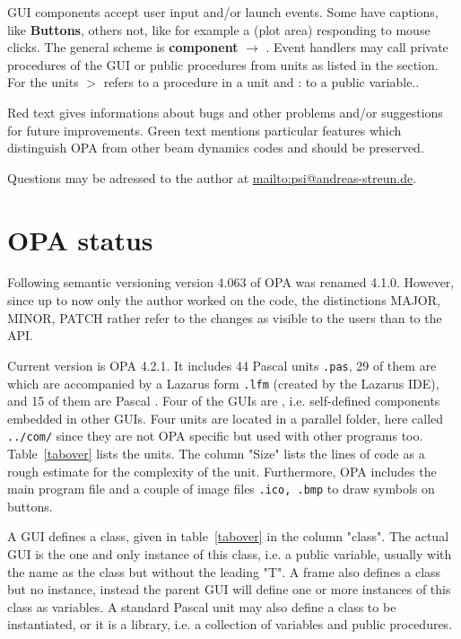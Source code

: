 \documentclass[12pt]{article}
\newcommand\code[1]{{\tt #1}}
\newcommand{\ofld}[1]{\colorbox{black!15}{{\bf #1}}}
\newcommand{\ofldx}[1]{\colorbox{black!15}{(#1)}}
\newcommand\guico[1]{{\color{blue}\code{#1}}}
\newcommand{\unico}[1]{{\color{burntorange}\code{#1}}}
\newcommand{\evcod}[2]{\ofld{#1} $\rightarrow$ \guico{#2}}
\newcommand{\prcod}[2]{\opauni{#1}$>$\unico{#2}}
\newcommand{\vrcod}[2]{\opauni{#1}:\unico{#2}}
\newcommand{\opagui}[1]{\colorbox{blue!20}{{\color{black}\code{#1}}}}
\newcommand{\opaguif}[1]{\colorbox{violet!30}{{\color{black}\code{#1}}}}
\newcommand{\opauni}[1]{\colorbox{orange!30}{{\color{black}\code{#1}}}}
\newcommand{\ouni}[1]{\hyperref[#1]{\opauni{#1}}}
\newcommand{\todo}[1]{{\color{red} #1}}
\newcommand{\feature}[1]{{\color{cadmiumgreen} #1}}
\begin{document}
GUI components accept user input and/or launch events. Some have captions, like \ofld{Buttons}, others not, like for example a \ofldx{plot area} responding to mouse clicks. The general scheme is \evcod{component}{event handler}. Event handlers may call private procedures of the GUI or public procedures from units as listed in the \guico{uses} section. For the units \prcod{unit}{procedure} refers to a procedure in a unit and \vrcod{unit}{variable} to a public variable..

\todo{Red text gives informations about bugs and other problems and/or suggestions for future improvements.} \feature{Green text mentions particular features which distinguish OPA from other beam dynamics codes and should be preserved.}

Questions may be adressed to the author at \url{mailto:psi@andreas-streun.de}.

\newpage


\section{OPA status}

Following semantic versioning \cite{semver} version 4.063 of OPA was renamed 4.1.0. However, since up to now only the author worked on the code, the distinctions MAJOR, MINOR, PATCH rather refer to the changes as visible to the users than to the API. 


Current version is OPA 4.2.1. It includes 44 Pascal units \code{.pas}, 29 of them are \opagui{GUIs} which are accompanied by a Lazarus form \code{.lfm} (created by the Lazarus IDE), and 15 of them are Pascal \opauni{units}. Four of the GUIs are \opaguif{frames}, i.e. self-defined components embedded in other GUIs. Four units are located in a parallel folder, here called \code{../com/} since they are not OPA specific but used with other programs too.
Table~\ref{tabover} lists the units. The column "Size" lists the lines of code as a rough estimate for the complexity of the unit. Furthermore, OPA includes the main program file \ouni{opa.lpr} and a couple of image files \code{.ico, .bmp} to draw symbols on buttons. 

A GUI defines a class, given in table~\ref{tabover} in the column "class". The actual GUI is the one and only instance of this class, i.e. a public variable, usually with the name as the class but without the leading "T". A frame also defines a class but no instance, instead the parent GUI will define one or more instances of this class as variables. A standard Pascal unit may also define a class to be instantiated, or it is a library, i.e. a collection of variables and public procedures.
\end{document}
